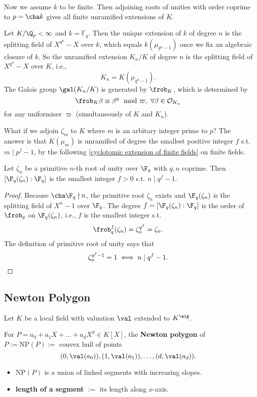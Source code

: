 Now we assume $k$ to be finite. Then adjoining roots of unities with order coprime to $p = \cha k$ gives all finite unramified extensions of $K$.

\begin{example}
    Let $K/\Q_p < \infty$ and $k = \mathbb{F}_q$.
    Then the unique extension of $k$ of degree $n$ is the splitting field of $X^{q^n} - X$ over $k$, which equals $k(\mu_{q^n - 1})$ once we fix an algebraic closure of $k$.
    So the unramified extension $K_n/K$ of degree $n$ is the splitting field of $X^{q^n} - X$ over $K$, i.e., \[K_n = K(\mu_{q^{n} - 1}).\] The Galois group $\gal(K_n/K)$ is generated by $\frob_K$, which is determined by \[\frob_K\beta \equiv \beta^q \mod\varpi,\ \forall\beta\in\mathcal{O}_{K_n}\]for any uniformiser $\varpi$ (simultaneously of $K$ and $K_n$).

    What if we adjoin $\zeta_{m}$ to $K$ where $m$ is an arbitary integer prime to $p$?
    The answer is that $K(\mu_m)$ is unramified of degree the smallest positive integer $f$ s.t. $m \mid p^f - 1$, by the following \cref{cyclotomic extension of finite fields} on finite fields.
\end{example}

\begin{lemma}\label{cyclotomic extension of finite fields}
    Let $\zeta_n$ be a primitive $n$-th root of unity over $\F_q$ with $q, n$ coprime. Then $[\F_q(\zeta_n) : \F_q]$ is the smallest integer $f > 0$ s.t. $n \mid q^f - 1$.
\end{lemma}
\begin{proof}
    Because $\cha\F_q\nmid n$, the primitive root $\zeta_n$ exists and $\F_q(\zeta_n)$ is the splitting field of $X^n - 1$ over $\F_q$.
    The degree $f = [\F_q(\zeta_n) : \F_q]$ is the order of $\frob_q$ on $\F_q(\zeta_n)$, i.e., $f$ is the smallest integer s.t. \[\frob_q^f(\zeta_n) = \zeta_n^{q^f} = \zeta_n.\] The definition of primitive root of unity says that \[\zeta_n^{q^f -1} = 1\iff n \mid q^f - 1.\qedhere\]
\end{proof}

\subsection{Newton Polygon}
Let $K$ be a local field with valuation $\val$ extended to $K^\alg$.

For $P = a_0 + a_1 X + \dots + a_dX^d\in K[X]$,
the \textbf{Newton polygon} of $P := \mathrm{NP}(P) := $ convex hull of points \[(0, \val(a_0)), (1, \val(a_1)),\dots, (d, \val(a_d)).\]
\begin{itemize}
    \item $\mathrm{NP}(P)$ is a union of linked segments with increasing slopes.
    \item \textbf{length of a segment} $:=$ its length along $x$-axis.
\end{itemize}


